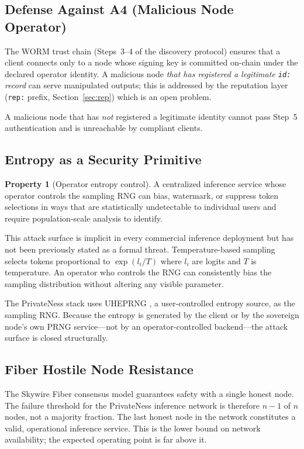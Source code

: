 \documentclass[11pt,a4paper]{article}
\theoremstyle{definition}
\newtheorem{property}{Property}[section]
\begin{document}
\subsection{Defense Against A4 (Malicious Node Operator)}
\label{sec:a4}

The WORM trust chain (Steps~3--4 of the discovery
protocol) ensures that a client connects only to a node whose signing key is
committed on-chain under the declared operator identity.  A malicious
node \emph{that has registered a legitimate \texttt{id:} record} can
serve manipulated outputs; this is addressed by the reputation layer
(\texttt{rep:} prefix, Section~\ref{sec:rep}) which is an open problem.

A malicious node that has \emph{not} registered a legitimate identity
cannot pass Step~5 authentication and is unreachable by compliant clients.

\subsection{Entropy as a Security Primitive}
\label{sec:entropy-threat}

\begin{property}[Operator entropy control]
A centralized inference service whose operator controls the sampling RNG
can bias, watermark, or suppress token selections in ways that are
statistically undetectable to individual users and require population-scale
analysis to identify.
\end{property}

This attack surface is implicit in every commercial inference deployment
but has not been previously stated as a formal threat.  Temperature-based
sampling selects tokens proportional to $\exp(l_i / T)$ where $l_i$ are
logits and $T$ is temperature.  An operator who controls the RNG can
consistently bias the sampling distribution without altering any visible
parameter.

The PrivateNess stack uses UHEPRNG \cite{pyuheprng}, a user-controlled
entropy source, as the sampling RNG.  Because the entropy is generated
by the client or by the sovereign node's own PRNG service---not by an
operator-controlled backend---the attack surface is closed structurally.

\subsection{Fiber Hostile Node Resistance}

The Skywire Fiber consensus model \cite{skywire} guarantees safety with
a single honest node.  The failure threshold for the PrivateNess inference
network is therefore $n - 1$ of $n$ nodes, not a majority fraction.  The
last honest node in the network constitutes a valid, operational inference
service.  This is the lower bound on network availability; the expected
operating point is far above it.
\end{document}
